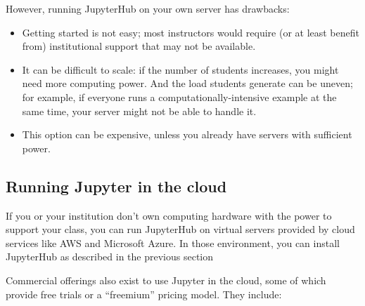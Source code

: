 \documentclass[]{book}
\begin{document}
However, running JupyterHub on your own server has drawbacks:

\begin{itemize}
\item
  Getting started is not easy; most instructors would require (or at
  least benefit from) institutional support that may not be available.
\item
  It can be difficult to scale: if the number of students increases, you
  might need more computing power. And the load students generate can be
  uneven; for example, if everyone runs a computationally-intensive
  example at the same time, your server might not be able to handle it.
\item
  This option can be expensive, unless you already have servers with
  sufficient power.
\end{itemize}

\subsection{Running Jupyter in the
cloud}\label{running-jupyter-in-the-cloud}

If you or your institution don't own computing hardware with the power
to support your class, you can run JupyterHub on virtual servers
provided by cloud services like AWS and Microsoft Azure. In those
environment, you can install JupyterHub as described in the previous
section

Commercial offerings also exist to use Jupyter in the cloud, some of
which provide free trials or a ``freemium'' pricing model. They include:
\end{document}
